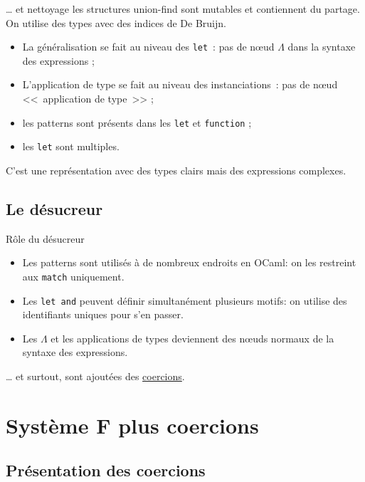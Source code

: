 \documentclass[final]{beamer}
\begin{document}
\begin{frame}{… et nettoyage}
 les structures union-find sont mutables et contiennent du partage. On utilise
 des types avec des indices de De Bruijn.

 \begin{itemize}
   \item La généralisation se fait au niveau des \texttt{let}~: pas de nœud
     $\Lambda$ dans la syntaxe des expressions ;
   \item L'application de type se fait au niveau des instanciations~: pas de
     nœud <<~application de type~>> ;
   \item les patterns sont présents dans les \texttt{let} et \texttt{function} ;
   \item les \texttt{let} sont multiples.
 \end{itemize}

 C'est une représentation avec des types clairs mais des expressions complexes.
\end{frame}

\subsection{Le désucreur}

\begin{frame}{Rôle du désucreur}
  \begin{itemize}
    \item Les patterns sont utilisés à de nombreux endroits en OCaml: on les
      restreint aux \texttt{match} uniquement.
    \item Les \texttt{let and} peuvent définir simultanément plusieurs motifs:
      on utilise des identifiants uniques pour s'en passer.
    \item Les $\Lambda$ et les applications de types deviennent des nœuds
      normaux de la syntaxe des expressions.
  \end{itemize}
  … et surtout, sont ajoutées des \underline{coercions}.
\end{frame}

\section{Système F plus coercions}

\subsection{Présentation des coercions}
\end{document}
